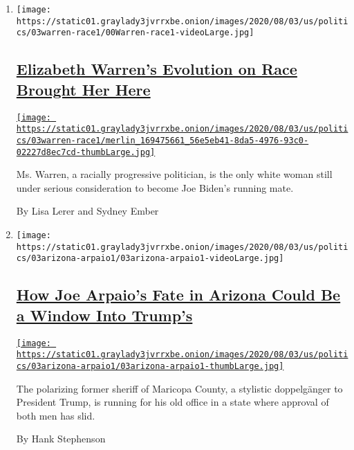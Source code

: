 \begin{enumerate}
\def\labelenumi{\arabic{enumi}.}
\item
  \texttt{[image: https://static01.graylady3jvrrxbe.onion/images/2020/08/03/us/politics/03warren-race1/00Warren-race1-videoLarge.jpg]}

  \hypertarget{elizabeth-warrens-evolution-on-race-brought-her-here}{%
  \subsection{\texorpdfstring{\href{/2020/08/02/us/politics/elizabeth-warren-biden-vice-president.html}{Elizabeth
  Warren's Evolution on Race Brought Her
  Here}}{Elizabeth Warren's Evolution on Race Brought Her Here}}\label{elizabeth-warrens-evolution-on-race-brought-her-here}}

  \href{/2020/08/02/us/politics/elizabeth-warren-biden-vice-president.html}{\texttt{[image: https://static01.graylady3jvrrxbe.onion/images/2020/08/03/us/politics/03warren-race1/merlin\_169475661\_56e5eb41-8da5-4976-93c0-02227d8ec7cd-thumbLarge.jpg]}}

  Ms. Warren, a racially progressive politician, is the only white woman
  still under serious consideration to become Joe Biden's running mate.

  By Lisa Lerer and Sydney Ember
\item
  \texttt{[image: https://static01.graylady3jvrrxbe.onion/images/2020/08/03/us/politics/03arizona-arpaio1/03arizona-arpaio1-videoLarge.jpg]}

  \hypertarget{how-joe-arpaios-fate-in-arizona-could-be-a-window-into-trumps}{%
  \subsection{\texorpdfstring{\href{/2020/08/02/us/politics/arizona-election-joe-arpaio.html}{How
  Joe Arpaio's Fate in Arizona Could Be a Window Into
  Trump's}}{How Joe Arpaio's Fate in Arizona Could Be a Window Into Trump's}}\label{how-joe-arpaios-fate-in-arizona-could-be-a-window-into-trumps}}

  \href{/2020/08/02/us/politics/arizona-election-joe-arpaio.html}{\texttt{[image: https://static01.graylady3jvrrxbe.onion/images/2020/08/03/us/politics/03arizona-arpaio1/03arizona-arpaio1-thumbLarge.jpg]}}

  The polarizing former sheriff of Maricopa County, a stylistic
  doppelgänger to President Trump, is running for his old office in a
  state where approval of both men has slid.

  By Hank Stephenson
\end{enumerate}

